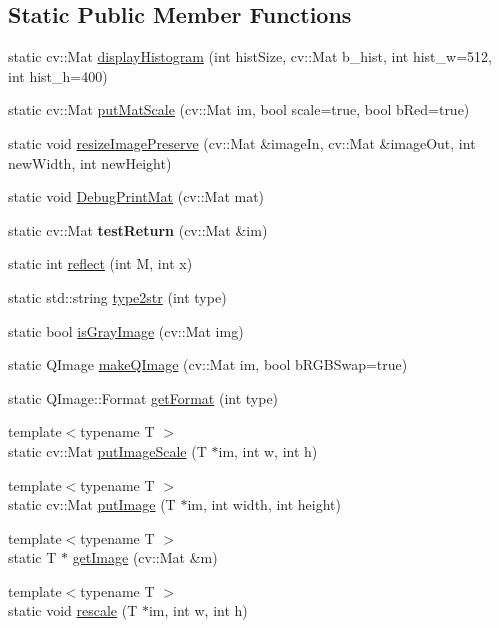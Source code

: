 \subsection*{Static Public Member Functions}
\begin{DoxyCompactItemize}
\item 
static cv\+::\+Mat \hyperlink{class_helper_functions_a5c5283b1bdbfff78c4381a93161effe5}{display\+Histogram} (int hist\+Size, cv\+::\+Mat b\+\_\+hist, int hist\+\_\+w=512, int hist\+\_\+h=400)
\item 
static cv\+::\+Mat \hyperlink{class_helper_functions_ad960d64773884aa54332b6b72ab5b876}{put\+Mat\+Scale} (cv\+::\+Mat im, bool scale=true, bool b\+Red=true)
\item 
static void \hyperlink{class_helper_functions_a7afac4bb91186ab522a3a1d640589e7e}{resize\+Image\+Preserve} (cv\+::\+Mat \&image\+In, cv\+::\+Mat \&image\+Out, int new\+Width, int new\+Height)
\item 
static void \hyperlink{class_helper_functions_a375b456c83eb7d8b7746a700e1ec38d1}{Debug\+Print\+Mat} (cv\+::\+Mat mat)
\item 
\mbox{\label{class_helper_functions_a9f86f713dcf72f162c085e88e26c9d08}} 
static cv\+::\+Mat {\bfseries test\+Return} (cv\+::\+Mat \&im)
\item 
static int \hyperlink{class_helper_functions_af83ef83dc647e660335bf5564f5fdda7}{reflect} (int M, int x)
\item 
static std\+::string \hyperlink{class_helper_functions_a0b9d882eaf6b7d85aad907ee3e94d197}{type2str} (int type)
\item 
static bool \hyperlink{class_helper_functions_aa04bae06c901791851f8d84607927001}{is\+Gray\+Image} (cv\+::\+Mat img)
\item 
static Q\+Image \hyperlink{class_helper_functions_a905e9fa464584f31d1537a84d8d348ae}{make\+Q\+Image} (cv\+::\+Mat im, bool b\+R\+G\+B\+Swap=true)
\item 
static Q\+Image\+::\+Format \hyperlink{class_helper_functions_a64c4fa7fceb347bc87600d926ab9a6dc}{get\+Format} (int type)
\item 
{\footnotesize template$<$typename T $>$ }\\static cv\+::\+Mat \hyperlink{class_helper_functions_a3bd3b4664ce50153abfb3b75a6fc51ba}{put\+Image\+Scale} (T $\ast$im, int w, int h)
\item 
{\footnotesize template$<$typename T $>$ }\\static cv\+::\+Mat \hyperlink{class_helper_functions_ae2a270fba6b59601060ec8ab2e338cc1}{put\+Image} (T $\ast$im, int width, int height)
\item 
{\footnotesize template$<$typename T $>$ }\\static T $\ast$ \hyperlink{class_helper_functions_a1d33065de9de137025c132c3c9766130}{get\+Image} (cv\+::\+Mat \&m)
\item 
{\footnotesize template$<$typename T $>$ }\\static void \hyperlink{class_helper_functions_a7807daf795fa0056e924f191be8abaf9}{rescale} (T $\ast$im, int w, int h)
\end{DoxyCompactItemize}


